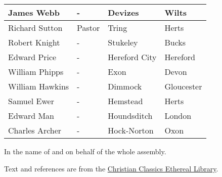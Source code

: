 \documentclass[12pt,a4paper]{book}
\begin{document}
\begin{tabularx}{\textwidth}{|l|l|l|l|}
\midrule
James Webb & - & Devizes & Wilts\\
\midrule
Richard Sutton & Pastor & Tring & Herts\\
\midrule
Robert Knight & - & Stukeley & Bucks\\
\midrule
Edward Price & - & Hereford City & Hereford\\
\midrule
William Phipps & - & Exon & Devon\\
\midrule
William Hawkins & - & Dimmock & Gloucester\\
\midrule
Samuel Ewer & - & Hemstead & Herts\\
\midrule
Edward Man & - & Houndsditch & London\\
\midrule
Charles Archer & - & Hock-Norton & Oxon\\
\bottomrule
\end{tabularx}

In the name of and on behalf of the whole assembly.

Text and references are from the \href{https://www.ccel.org/creeds/bcf/bcf.htm}{Christian Classics Ethereal Library}.
\end{document}
